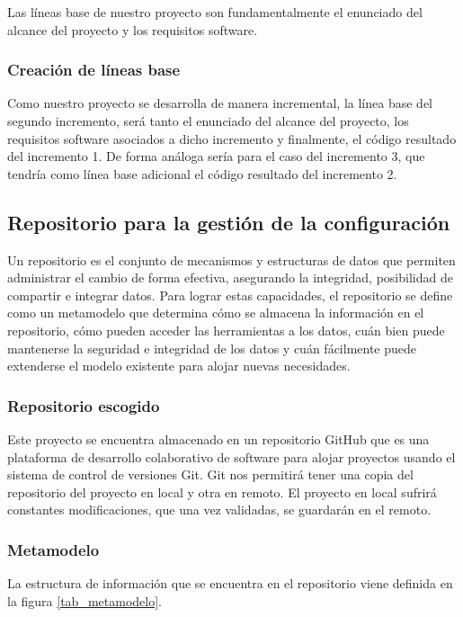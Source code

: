Las líneas base de nuestro proyecto son fundamentalmente el enunciado del alcance del proyecto y los requisitos software.

\subsubsection{Creación de líneas base}
Como nuestro proyecto se desarrolla de manera incremental, la línea base del segundo incremento, será tanto el enunciado del alcance del proyecto, los requisitos software asociados a dicho incremento y finalmente, el código resultado del incremento 1. De forma análoga sería para el caso del incremento 3, que tendría como línea base adicional el código resultado del incremento 2.

\subsection{Repositorio para la gestión de la configuración}
Un repositorio es el conjunto de mecanismos y estructuras de datos que permiten administrar el cambio de forma efectiva, asegurando la integridad, posibilidad de compartir e integrar datos. Para lograr estas capacidades, el repositorio se define como un metamodelo que determina cómo se almacena la información en el repositorio, cómo pueden acceder las herramientas a los datos, cuán bien puede mantenerse la seguridad e integridad de los datos y cuán fácilmente puede extenderse el modelo existente para alojar nuevas necesidades\cite{pressman}.

\subsubsection{Repositorio escogido}
Este proyecto se encuentra almacenado en un repositorio GitHub que es una plataforma de desarrollo colaborativo de software para alojar proyectos usando el sistema de control de versiones Git\cite{github}. Git nos permitirá tener una copia del repositorio del proyecto en local y otra en remoto. El proyecto en local sufrirá constantes modificaciones, que una vez validadas, se guardarán en el remoto.

\subsubsection{Metamodelo}
La estructura de información que se encuentra en el repositorio viene definida en la figura \ref{tab_metamodelo}.

